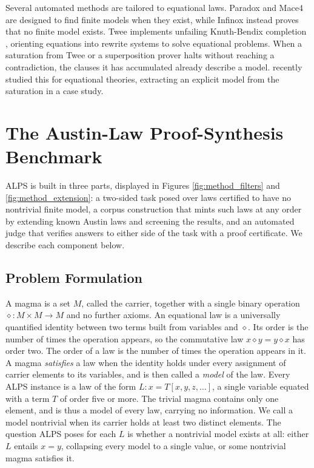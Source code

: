 \documentclass[letterpaper]{article} %
\newcommand{\op}{\diamond}
\begin{document}
Several automated methods are tailored to equational laws. Paradox and Mace4 \citep{claessen2003new, mccune2003mace4} are designed to find finite models when they exist, while Infinox \citep{claessen2011automated} instead proves that no finite model exists. Twee \citep{smallbone2021twee} implements unfailing Knuth-Bendix completion \citep{knuth1970simple, bachmair1989completion}, orienting equations into rewrite systems to solve equational problems. When a saturation from Twee or a superposition prover halts without reaching a contradiction, the clauses it has accumulated already describe a model. \citet{janota2026case} recently studied this for equational theories, extracting an explicit model from the saturation in a case study. 


\section{The Austin-Law Proof-Synthesis Benchmark}





ALPS is built in three parts, displayed in Figures \ref{fig:method_filters} and \ref{fig:method_extension}: a two-sided task posed over laws certified to have no nontrivial finite model, a corpus construction that mints such laws at any order by extending known Austin laws and screening the results, and an automated judge that verifies answers to either side of the task with a proof certificate. We describe each component below.

\subsection{Problem Formulation}


A magma is a set $M$, called the carrier, together with a single binary operation ${\op}\colon M \times M \to M$ and no further axioms. An equational law is a universally quantified identity between two terms built from variables and $\op$. Its order is the number of times the operation appears, so the commutative law $x \op y = y \op x$ has order two. The order of a law is the number of times the operation appears in it. A magma \textit{satisfies} a law when the identity holds under every assignment of carrier elements to its variables, and is then called a \textit{model} of the law.
Every ALPS instance is a law of the form $L\colon x = T[x, y, z, \dots]$, a single variable equated with a term $T$ of order five or more. The trivial magma contains only one element, and is thus a model of every law, carrying no information. We call a model nontrivial when its carrier holds at least two distinct elements. The question ALPS poses for each $L$ is whether a nontrivial model exists at all: either $L$ entails $x = y$, collapsing every model to a single value, or some nontrivial magma satisfies it.
\end{document}
